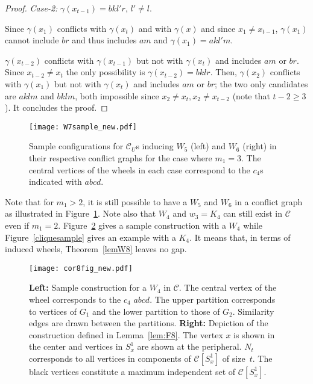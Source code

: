 \documentclass[final]{dmtcs-episciences}
\begin{document}
\begin{proof}
 \emph{Case-2:} $\gamma(x_{t-1})=bkl'r$, $l'\neq l$.

 Since $\gamma(x_{1})$ conflicts with $\gamma(x_{t})$ and with $\gamma(x)$ and since $x_1\neq x_{t-1}$, $\gamma(x_{1})$ cannot include $br$ and thus includes $am$ and  $\gamma(x_{1})=akl'm$.

$\gamma(x_{t-2})$ conflicts with $\gamma(x_{t-1})$ but not with $\gamma(x_{t})$ and includes  $am$ or $br$.
Since $x_{t-2}\neq x_t$ the only possibility is 
$\gamma(x_{t-2})=bklr$. 
Then, $\gamma(x_{2})$ conflicts with $\gamma(x_1)$ but not with $\gamma(x_{t})$ and includes  $am$ or $br$; the two only candidates are $aklm$ and $bklm$, both impossible since $x_2\neq x_t, x_2\neq x_{t-2}$ (note that $t-2\geq 3$). It concludes the proof.
\end{proof}

\begin{figure}[t]	   
\begin{center}	   
\texttt{[image: W7sample\_new.pdf]} 
\caption{\sf Sample configurations for $\mathcal{C}_U$s inducing $W_5$ (left) and $W_6$ (right) in their respective 
conflict graphs
for the case where $m_1=3$.
The central vertices of the wheels in each case correspond to the $c_4$s  
indicated with $abcd$.
} 
\label{w7sample}	   
\end{center}	   
\end{figure}  

Note that for $m_1>2$, it is still possible to have a $W_5$ and 
$W_6$ in a conflict graph  as illustrated in Figure~\ref{w7sample}. Note also that $W_4$  and $w_3=K_4$ can still exist in $\mathcal{C}$ even if $m_1=2$. Figure~\ref{cor8fig} gives a sample construction with a $W_4$ while Figure~\ref{cliquesample} gives an example with a $K_4$. 
It means that, in terms of induced wheels, Theorem~\ref{lemW8}  leaves no gap. 


  
  \begin{figure}[t]     
\begin{center}	   
\texttt{[image: cor8fig\_new.pdf]} 
\caption{\sf \textbf{Left:} Sample construction for a $W_4$ in $\mathcal{C}$. The central vertex of the wheel corresponds to the $c_4$  $abcd$. The upper partition corresponds to vertices of $G_1$ and the lower partition to those of $G_2$. Similarity edges are drawn between the partitions. \textbf{ Right:} Depiction of the construction defined in Lemma~\ref{lem:F8}. The vertex $x$  is shown in the center and vertices in $S_x^1$ are shown at the peripheral. $N_t$ corresponds to all vertices in components of $\mathcal{C}[S_x^1]$ of size~$t$. The black vertices constitute a maximum independent set of $\mathcal{C}[S_x^1]$. 
} 
\label{cor8fig}	   
\end{center}	   
\end{figure}  
\end{document}
